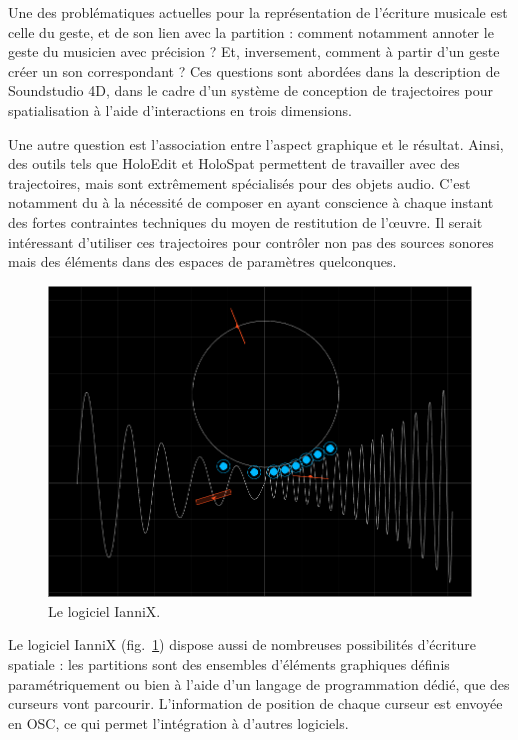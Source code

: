 \documentclass[french,12pt]{article}
\begin{document}
Une des problématiques actuelles pour la représentation de l'écriture musicale est celle du geste, et de son lien avec la partition : comment notamment annoter le geste du musicien avec précision ? Et, inversement, comment à partir d'un geste créer un son correspondant ? Ces questions sont abordées dans la description de Soundstudio 4D\cite{sheridan_soundstudio_2004}, dans le cadre d'un système de conception de trajectoires pour spatialisation à l'aide d'interactions en trois dimensions.

Une autre question est l'association entre l'aspect graphique et le résultat. Ainsi, des outils tels que HoloEdit et HoloSpat permettent de travailler avec des trajectoires, mais sont extrêmement spécialisés pour des objets audio. C'est notamment du à la nécessité de composer en ayant conscience à chaque instant des fortes contraintes techniques du moyen de restitution de l'œuvre. Il serait intéressant d'utiliser ces trajectoires pour contrôler non pas des sources sonores mais des éléments dans des espaces de paramètres quelconques.

\begin{figure}[h]
    \centering
    \includegraphics[scale=0.3]{images/iannix.png}
    \caption{Le logiciel IanniX.}
    \label{fig.iannix}
\end{figure}

Le logiciel IanniX\cite{jacquemin_iannix_2012} (fig.~\ref{fig.iannix}) dispose aussi de nombreuses possibilités d'écriture spatiale : les partitions sont des ensembles d'éléments graphiques définis paramétriquement ou bien à l'aide d'un langage de programmation dédié, que des curseurs vont parcourir. L'information de position de chaque curseur est envoyée en OSC, ce qui permet l'intégration à d'autres logiciels.
\end{document}
